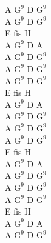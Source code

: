 \begin{chord}
    \footnotesize{
    A $\mathrm{G^9}$ D $\mathrm{G^9}$\\
    A $\mathrm{G^9}$ D $\mathrm{G^9}$\\
    E fis H\\
    A $\mathrm{G^9}$ D A\\
    A $\mathrm{G^9}$ D $\mathrm{G^9}$\\
    A $\mathrm{G^9}$ D $\mathrm{G^9}$\\
    A $\mathrm{G^9}$ D $\mathrm{G^9}$\\
    E fis H\\
    A $\mathrm{G^9}$ D A\\
    A $\mathrm{G^9}$ D $\mathrm{G^9}$\\
    A $\mathrm{G^9}$ D $\mathrm{G^9}$\\
    A $\mathrm{G^9}$ D $\mathrm{G^9}$\\
    E fis H\\
    A $\mathrm{G^9}$ D A\\
    A $\mathrm{G^9}$ D $\mathrm{G^9}$\\
    A $\mathrm{G^9}$ D $\mathrm{G^9}$\\
    A $\mathrm{G^9}$ D $\mathrm{G^9}$\\
    E fis H\\
    A $\mathrm{G^9}$ D A\\
    A $\mathrm{G^9}$ D $\mathrm{G^9}$
    }
\end{chord}
